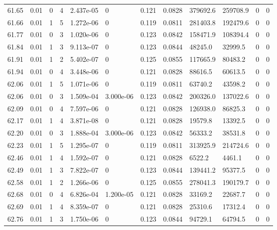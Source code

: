 \documentclass[preview]{standalone}
\begin{document}
{{{{{{{{{{{{{{{{{{\begin{tabular}{L{1.2cm}C{1.2cm} C{0.3cm}C{0.5cm} C{1.4cm}C{1.4cm} C{1.4cm}C{1.4cm} C{1.6cm}C{1.6cm} C{1.6cm}C{1.6cm}}
  61.65  &  0.01  & 0     &  4 &  2.437e-05  & 0  &  0.121&   0.0828& 379692.6 & 259708.9   &  0 & 0  \\ 
  61.66  &  0.01  & 1     &  5 &  1.272e-06  & 0  &  0.119&   0.0811& 281403.8 & 192479.6   &  0 & 0  \\ 
  61.77  &  0.01  & 0     &  3 &  1.020e-06  & 0  &  0.123&   0.0842& 158471.9 & 108394.4   &  0 & 0  \\ 
  61.84  &  0.01  & 1     &  3 &  9.113e-07  & 0  &  0.123&   0.0844& 48245.0 & 32999.5   &  0 & 0  \\ 
  61.91  &  0.01  & 1     &  2 &  5.402e-07  & 0  &  0.125&   0.0855& 117665.9 & 80483.2   &  0 & 0  \\ 
  61.94  &  0.01  & 0     &  4 &  3.448e-06  & 0  &  0.121&   0.0828& 88616.5 & 60613.5   &  0 & 0  \\ 
  62.06  &  0.01  & 1     &  5 &  1.071e-06  & 0  &  0.119&   0.0811& 63740.2 & 43598.2   &  0 & 0  \\ 
  62.06  &  0.01  & 0     &  3 &  1.509e-04  & 3.000e-06  &  0.123&   0.0842& 200326.0 & 137022.6   &  0 & 0  \\ 
  62.09  &  0.01  & 0     &  4 &  7.597e-06  & 0  &  0.121&   0.0828& 126938.0 & 86825.3   &  0 & 0  \\ 
  62.17  &  0.01  & 1     &  4 &  3.871e-08  & 0  &  0.121&   0.0828& 19579.8 & 13392.5   &  0 & 0  \\ 
  62.20  &  0.01  & 0     &  3 &  1.888e-04  & 3.000e-06  &  0.123&   0.0842& 56333.2 & 38531.8   &  0 & 0  \\ 
  62.23  &  0.01  & 1     &  5 &  1.295e-07  & 0  &  0.119&   0.0811& 313925.9 & 214724.6   &  0 & 0  \\ 
  62.46  &  0.01  & 1     &  4 &  1.592e-07  & 0  &  0.121&   0.0828& 6522.2 & 4461.1   &  0 & 0  \\ 
  62.49  &  0.01  & 1     &  3 &  7.822e-07  & 0  &  0.123&   0.0844& 139441.2 & 95377.5   &  0 & 0  \\ 
  62.58  &  0.01  & 1     &  2 &  1.266e-06  & 0  &  0.125&   0.0855& 278041.3 & 190179.7   &  0 & 0  \\ 
  62.68  &  0.01  & 0     &  4 &  6.826e-04  & 1.200e-05  &  0.121&   0.0828& 33169.2 & 22687.7   &  0 & 0  \\ 
  62.69  &  0.01  & 1     &  4 &  8.359e-07  & 0  &  0.121&   0.0828& 25310.6 & 17312.4   &  0 & 0  \\ 
  62.76  &  0.01  & 1     &  3 &  1.750e-06  & 0  &  0.123&   0.0844& 94729.1 & 64794.5   &  0 & 0  \\ 

\end{tabular}}}}}}}}}}}}}}}}}}}
\end{document}
